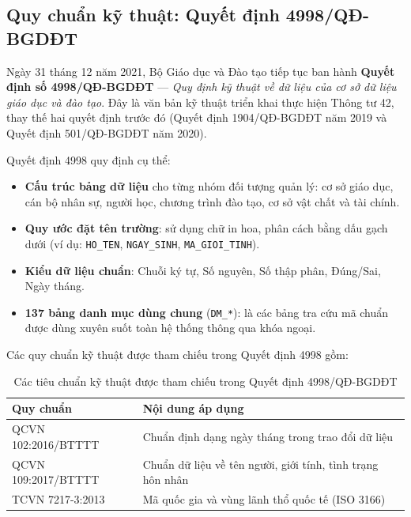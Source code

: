 \subsection{Quy chuẩn kỹ thuật: Quyết định 4998/QĐ-BGDĐT}

Ngày 31 tháng 12 năm 2021, Bộ Giáo dục và Đào tạo tiếp tục ban hành \textbf{Quyết định số 4998/QĐ-BGDĐT} — \textit{Quy định kỹ thuật về dữ liệu của cơ sở dữ liệu giáo dục và đào tạo}. Đây là văn bản kỹ thuật triển khai thực hiện Thông tư 42, thay thế hai quyết định trước đó (Quyết định 1904/QĐ-BGDĐT năm 2019 và Quyết định 501/QĐ-BGDĐT năm 2020).

Quyết định 4998 quy định cụ thể:

\begin{itemize}
    \item \textbf{Cấu trúc bảng dữ liệu} cho từng nhóm đối tượng quản lý: cơ sở giáo dục, cán bộ nhân sự, người học, chương trình đào tạo, cơ sở vật chất và tài chính.
    \item \textbf{Quy ước đặt tên trường}: sử dụng chữ in hoa, phân cách bằng dấu gạch dưới (ví dụ: \texttt{HO\_TEN}, \texttt{NGAY\_SINH}, \texttt{MA\_GIOI\_TINH}).
    \item \textbf{Kiểu dữ liệu chuẩn}: Chuỗi ký tự, Số nguyên, Số thập phân, Đúng/Sai, Ngày tháng.
    \item \textbf{137 bảng danh mục dùng chung} (\texttt{DM\_*}): là các bảng tra cứu mã chuẩn được dùng xuyên suốt toàn hệ thống thông qua khóa ngoại.
\end{itemize}

Các quy chuẩn kỹ thuật được tham chiếu trong Quyết định 4998 gồm:

\begin{table}[H]
\centering
\renewcommand{\arraystretch}{1.4}
\begin{tabularx}{\textwidth}{|l|X|}
\hline
\textbf{Quy chuẩn} & \textbf{Nội dung áp dụng} \\
\hline
QCVN 102:2016/BTTTT & Chuẩn định dạng ngày tháng trong trao đổi dữ liệu \\
\hline
QCVN 109:2017/BTTTT & Chuẩn dữ liệu về tên người, giới tính, tình trạng hôn nhân \\
\hline
TCVN 7217-3:2013 & Mã quốc gia và vùng lãnh thổ quốc tế (ISO 3166) \\
\hline
\end{tabularx}
\caption{Các tiêu chuẩn kỹ thuật được tham chiếu trong Quyết định 4998/QĐ-BGDĐT}
\label{tab:standards}
\end{table}

